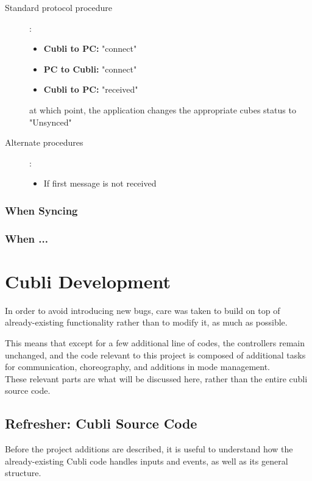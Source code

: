 \begin{description}
\item[Standard protocol procedure]:

\begin{itemize}
\item[] \textbf{Cubli to PC:} "connect"
\item[] \textbf{PC to Cubli:} "connect"
\item[] \textbf{Cubli to PC:} "received"
\end{itemize}

at which point, the application changes the appropriate cubes status to "Unsynced"
\item[Alternate procedures]:

\begin{itemize}
\item If first message is not received
\end{itemize}
\end{description}
\subsubsection{When Syncing}
\subsubsection{When ...}

\section{Cubli Development}

In order to avoid introducing new bugs, care was taken to build on top of already-existing functionality rather than to modify it, as much as possible.

This means that except for a few additional line of codes, the controllers remain unchanged, and the code relevant to this project is composed of additional tasks for communication, choreography, and additions in mode management.\\

These relevant parts are what will be discussed here, rather than the entire cubli source code.

\subsection{Refresher: Cubli Source Code }

Before the project additions are described, it is useful to understand how the already-existing Cubli code handles inputs and events, as well as its general structure.\\

